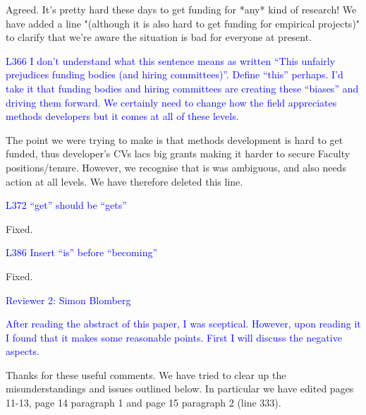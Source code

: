 \documentclass[12pt]{letter}
\begin{document}
\begin{letter}{}
Agreed. It's pretty hard these days to get funding for *any* kind of research! We have added a line "(although it is also hard to get funding for empirical projects)" to clarify that we're aware the situation is bad for everyone at present.

\textcolor{blue}{L366 I don't understand what this sentence means as written “This unfairly prejudices funding bodies (and hiring committees)”. Define “this” perhaps. I'd take it that funding bodies and hiring committees are creating these “biases” and driving them forward. We certainly need to change how the field appreciates methods developers but it comes at all of these levels.}

The point we were trying to make is that methods development is hard to get funded, thus developer's CVs lacs big grants making it harder to secure Faculty positions/tenure. However, we recognise that is was ambiguous, and also needs action at all levels. We have therefore deleted this line.

\textcolor{blue}{L372 “get” should be “gets”}

Fixed.

\textcolor{blue}{L386 Insert “is” before “becoming”}

Fixed. 

\textcolor{blue}{Reviewer 2: Simon Blomberg}

\textcolor{blue}{After reading the abstract of this paper, I was sceptical. However, upon reading it I found that it makes some reasonable points. First I will discuss the negative aspects.}

Thanks for these useful comments. We have tried to clear up the misunderstandings and issues outlined below. In particular we have edited pages 11-13, page 14 paragraph 1 and page 15 paragraph 2 (line 333).


\end{letter}
\end{document}
